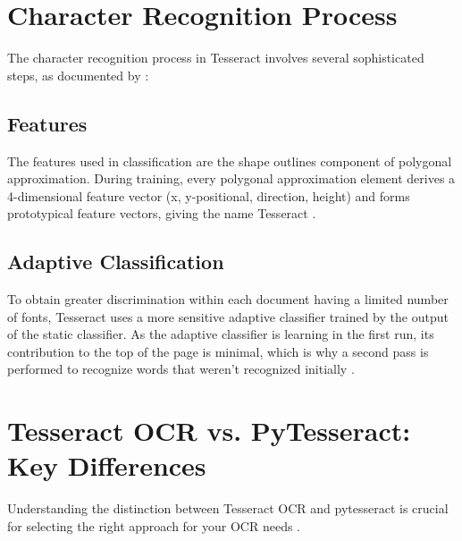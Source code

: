 \section{Character Recognition Process}

The character recognition process in Tesseract involves several sophisticated steps, as documented by \cite{Joshi:2021}:

\subsection{Features}
The features used in classification are the shape outlines component of polygonal approximation. During training, every polygonal approximation element derives a 4-dimensional feature vector (x, y-positional, direction, height) and forms prototypical feature vectors, giving the name Tesseract \cite {Joshi:2021, Smith:2009}.

\subsection{Adaptive Classification}
To obtain greater discrimination within each document having a limited number of fonts, Tesseract uses a more sensitive adaptive classifier trained by the output of the static classifier. As the adaptive classifier is learning in the first run, its contribution to the top of the page is minimal, which is why a second pass is performed to recognize words that weren't recognized initially \cite {Joshi:2021}.

\section{Tesseract OCR vs. PyTesseract: Key Differences}

Understanding the distinction between Tesseract OCR and pytesseract is crucial for selecting the right approach for your OCR needs \cite {Anitha:2024, DataCamp:2024}.

